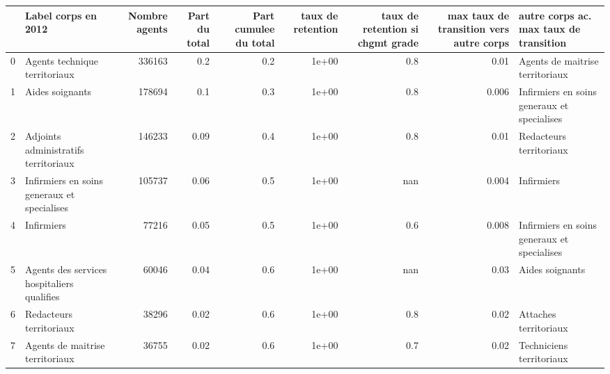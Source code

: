 \documentclass[11pt,a4paper]{article}
\begin{document}
\begin{tabular}{llrrrrrrl}
	\toprule
	{} &                                Label corps en 2012 &  Nombre agents &  Part du total &  Part cumulee du total &  taux de retention &  taux de retention si chgmt grade &  max taux de transition vers autre corps &             autre corps ac. max taux de transition \\
	\midrule
	0   &                      Agents technique territoriaux &         336163 &            0.2 &                    0.2 &              1e+00 &                               0.8 &                                     0.01 &                    Agents de maitrise territoriaux \\
	1   &                                    Aides soignants &         178694 &            0.1 &                    0.3 &              1e+00 &                               0.8 &                                    0.006 &        Infirmiers en soins generaux et specialises \\
	2   &               Adjoints administratifs territoriaux &         146233 &           0.09 &                    0.4 &              1e+00 &                               0.8 &                                     0.01 &                            Redacteurs territoriaux \\
	3   &        Infirmiers en soins generaux et specialises &         105737 &           0.06 &                    0.5 &              1e+00 &                               nan &                                    0.004 &                                         Infirmiers \\
	4   &                                         Infirmiers &          77216 &           0.05 &                    0.5 &              1e+00 &                               0.6 &                                    0.008 &        Infirmiers en soins generaux et specialises \\
	5   &         Agents des services hospitaliers qualifies &          60046 &           0.04 &                    0.6 &              1e+00 &                               nan &                                     0.03 &                                    Aides soignants \\
	6   &                            Redacteurs territoriaux &          38296 &           0.02 &                    0.6 &              1e+00 &                               0.8 &                                     0.02 &                              Attaches territoriaux \\
	7   &                    Agents de maitrise territoriaux &          36755 &           0.02 &                    0.6 &              1e+00 &                               0.7 &                                     0.02 &                           Techniciens territoriaux \\

\end{tabular}
\end{document}
